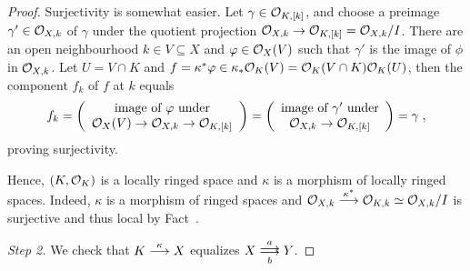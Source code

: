 \documentclass[a4paper,parskip=half,numbers=enddot, DIV=12]{scrreprt}
\begin{document}
\begin{proof}
	Surjectivity is somewhat easier. Let $\gamma\in\mathcal{O}_{K,[k]}$, and choose a preimage $\gamma'\in\mathcal{O}_{X,k}$ of $\gamma$ under the quotient projection $\Oo_{X,k}\morphism\Oo_{K,[k]}=\Oo_{X,k}/I$. There are an open neighbourhood $k\in V\subseteq X$ and $\varphi\in\mathcal{O}_X(V)$ such that $\gamma'$ is the image of $\phi$ in $\mathcal{O}_{X,k}$. Let $U=V\cap K$ and $f=\kappa^*\varphi\in\kappa_*\mathcal{O}_K(V)=\mathcal{O}_K(V\cap K)\mathcal{O}_K(U)$, then the component $f_k$ of $f$ at $k$ equals
	\begin{align*}
		f_k=\left(
		\begin{array}{c}
			\text{image of }\phi\text{ under}\\
			\Oo_X(V)\morphism\Oo_{X,k}\morphism\Oo_{K,[k]}
		\end{array}\right)=\left(
		\begin{array}{c}
			\text{image of }\gamma'\text{ under}\\
			\Oo_{X,k}\morphism\Oo_{K,[k]}
		\end{array}\right)=\gamma\;,
	\end{align*}
	proving surjectivity.
	
	Hence, $(K,\mathcal{O}_K)$ is a locally ringed space and $\kappa$ is a morphism of locally ringed spaces. Indeed, $\kappa$ is a morphism of ringed spaces and $\Oo_{X,k}\morphism[\kappa^*]\Oo_{K,k}\simeq\Oo_{X,k}/I$ is surjective and thus local by Fact~.
	
	\emph{Step 2.} We check that $K\morphism[\kappa]X$ equalizes $X\doublemorphism[a][\smash{b}]Y$.
	

\end{proof}
\end{document}
